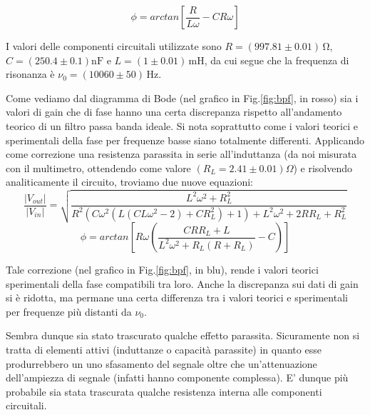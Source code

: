 \begin{equation}
\phi=arctan\left[\frac{R}{L \omega}-C R \omega \right]
\label{eq:bpfPhi}
\end{equation}

\noindent I valori delle componenti circuitali utilizzate sono $R=(997.81 \pm 0.01)\,\si{\ohm}$, $C=(250.4 \pm 0.1)\si{\nano\farad}$ e $L=(1 \pm 0.01)\,\si{\milli\henry}$, da cui segue che la frequenza di risonanza è $\nu_0 = (10060 \pm 50)\,\si{\hertz}$.

Come vediamo dal diagramma di Bode (nel grafico in Fig.\ref{fig:bpf}, in rosso) sia i valori di gain che di fase hanno una certa discrepanza rispetto all'andamento teorico di un filtro passa banda ideale. Si nota soprattutto come i valori teorici e sperimentali della fase per frequenze basse siano totalmente differenti.
Applicando come correzione una resistenza parassita in serie all'induttanza (da noi misurata con il multimetro, ottendendo come valore $(R_L=2.41\pm 0.01) \Omega$) e risolvendo analiticamente il circuito, troviamo due nuove equazioni:\\

\noindent
\begin{equation}
\frac{|V_{out}|}{|V_{in}|}=\sqrt{\frac{L^2 \omega ^2+R_L^2}{R^2 \left(C \omega ^2 \left(L \left(C L \omega ^2-2\right)+C R_L^2\right)+1\right)+L^2 \omega ^2+2 R R_L+R_L^2}}
\label{bpfGain_corr}
\end{equation}
\begin{equation}
\phi=arctan\left[R \omega \left(\frac{C R R_L+L}{L^2 \omega ^2+R_L (R+R_L)}-C\right)\right]
\label{bpfPhi_corr}
\end{equation}
\break

\noindent Tale correzione (nel grafico in Fig.\ref{fig:bpf}, in blu), rende i valori teorici sperimentali della fase compatibili tra loro. Anche la discrepanza sui dati di gain si è ridotta, ma permane una certa differenza tra i valori teorici e sperimentali per frequenze più distanti da $\nu_0$.

Sembra dunque sia stato trascurato qualche effetto parassita. Sicuramente non si tratta di elementi attivi (induttanze o capacità parassite) in quanto esse produrrebbero un uno sfasamento del segnale oltre che un'attenuazione dell'ampiezza di segnale (infatti hanno componente complessa). E' dunque più probabile sia stata trascurata qualche resistenza interna alle componenti circuitali.